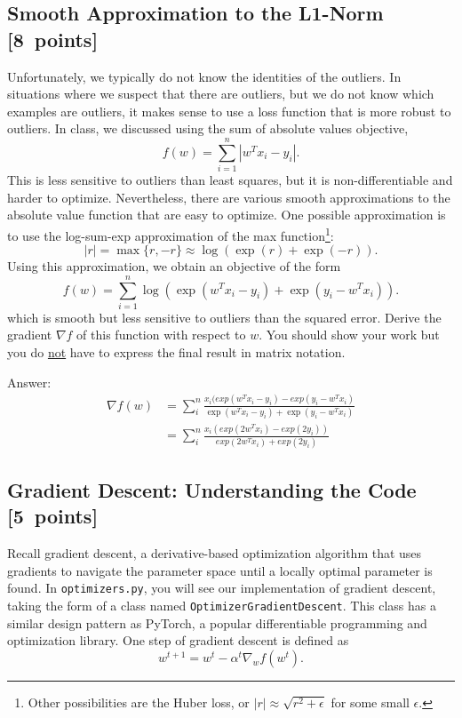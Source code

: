 \documentclass{article}
\newcommand{\blu}[1]{{\textcolor{blu}{#1}}}
\newenvironment{answer}{\par\begingroup\color{gre}Answer: }{\endgroup}
\let\ask\blu
\newcommand\pts[1]{\textcolor{pointscolour}{[#1~points]}}
\begin{document}
\subsection{Smooth Approximation to the L1-Norm \pts{8}}

Unfortunately, we typically do not know the identities of the outliers. In situations where we suspect that there are outliers, but we do not know which examples are outliers, it makes sense to use a loss function that is more robust to outliers. In class, we discussed using the sum of absolute values objective,
\[
f(w) = \sum_{i=1}^n |w^Tx_i - y_i|.
\]
This is less sensitive to outliers than least squares, but it is non-differentiable and harder to optimize. Nevertheless, there are various smooth approximations to the absolute value function that are easy to optimize. One possible approximation is to use the log-sum-exp approximation of the max function\footnote{Other possibilities are the Huber loss, or $|r|\approx \sqrt{r^2+\epsilon}$ for some small $\epsilon$.}:
\[
|r| = \max\{r, -r\} \approx \log(\exp(r) + \exp(-r)).
\]
Using this approximation, we obtain an objective of the form
\[
f(w) {=} \sum_{i=1}^n  \log\left(\exp(w^Tx_i - y_i) + \exp(y_i - w^Tx_i)\right).
\]
which is smooth but less sensitive to outliers than the squared error. \ask{Derive
 the gradient $\nabla f$ of this function with respect to $w$. You should show your work but you do \underline{not} have to express the final result in matrix notation.}

\begin{answer}
	\begin{equation}
		\begin{split}
			\nabla f(w) &= \sum_i^n \frac{x_i(exp(w^{T}x_i - y_i)- exp(y_i - w^{T}x_i)}{\exp(w^Tx_i - y_i) + \exp(y_i - w^Tx_i)} \\
			&= \sum_i^n \frac{x_i(exp(2w^{T}x_i)- exp(2y_i))}{exp(2w^{T}x_i) + exp(2y_i)}
		\end{split}
	\end{equation}
\end{answer}

\subsection{Gradient Descent: Understanding the Code \pts{5}}

Recall gradient descent, a derivative-based optimization algorithm that uses gradients to navigate the parameter space until a locally optimal parameter is found. In \texttt{optimizers.py}, you will see our implementation of gradient descent, taking the form of a class named \texttt{OptimizerGradientDescent}. This class has a similar design pattern as PyTorch, a popular differentiable programming and optimization library. One step of gradient descent is defined as
\[
	w^{t+1} = w^t - \alpha^t \nabla_w f(w^t)
.\]
\end{document}
